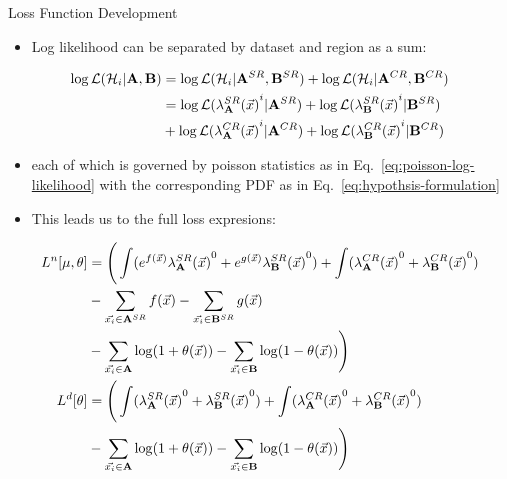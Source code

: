 \documentclass[notheorems]{beamer}
\begin{document}
\begin{frame}{Loss Function Development}
    \begin{itemize}
        \item Log likelihood can be separated by dataset and region as a sum:
    \end{itemize}
    \begin{equation}
    \begin{aligned}
        \log\mathcal{L}({\mathcal{H}_{i}} | {\mathbf{A}}, {\mathbf{B}})
        &= \log\mathcal{L}({\mathcal{H}_{i}}|{\mathbf{A}}^{SR}, {\mathbf{B}}^{SR}) + \log\mathcal{L}({\mathcal{H}_{i}}|{\mathbf{A}}^{CR}, {\mathbf{B}}^{CR}) \\&
        = \log\mathcal{L}({{\lambda}_{{\mathbf{A}}}^{SR}(\vec{{x}})}^i|{\mathbf{A}}^{SR}) + \log\mathcal{L}({{\lambda}_{{\mathbf{B}}}^{SR}(\vec{{x}})}^i|{\mathbf{B}}^{SR}) \\&
        + \log\mathcal{L}({{\lambda}_{{\mathbf{A}}}^{CR}(\vec{{x}})}^i|{\mathbf{A}}^{CR}) + \log\mathcal{L}({{\lambda}_{{\mathbf{B}}}^{CR}(\vec{{x}})}^i|{\mathbf{B}}^{CR})
    \end{aligned}
    \end{equation}
    \begin{itemize}
        \item each of which is governed by poisson statistics as in Eq.~\ref{eq:poisson-log-likelihood} with the corresponding PDF as in Eq.~\ref{eq:hypothsis-formulation}
    \end{itemize}
\end{frame}

\begin{frame}
    \begin{itemize}
        \item This leads us to the full loss expresions:
    \end{itemize}
    \begin{equation}
    \begin{aligned}
        L^{n}[{\mu}, {\theta}] &= \Bigg(
            \int (e^{f(\vec{{x}})}{{\lambda}_{{\mathbf{A}}}^{SR}(\vec{{x}})}^0 + e^{g(\vec{{x}})}{{\lambda}_{{\mathbf{B}}}^{SR}(\vec{{x}})}^0)
            + \int ({{\lambda}_{{\mathbf{A}}}^{CR}(\vec{{x}})}^0 + {{\lambda}_{{\mathbf{B}}}^{CR}(\vec{{x}})}^0)
            \\&
            - \sum\limits_{{\vec{{x}_i}} \in {\mathbf{A}}^{SR}} f(\vec{{x}})
            - \sum\limits_{{\vec{{x}_i}} \in {\mathbf{B}}^{SR}} g(\vec{{x}}) \\&
            - \sum\limits_{{\vec{{x}_i}} \in {\mathbf{A}}} \log(1 + {{\theta}(\vec{{x}})})
            - \sum\limits_{{\vec{{x}_i}} \in {\mathbf{B}}} \log(1 - {{\theta}(\vec{{x}})})
        \Bigg)
        \\
        L^{d}[{\theta}] &= \Bigg(
            \int ({{\lambda}_{{\mathbf{A}}}^{SR}(\vec{{x}})}^0 + {{\lambda}_{{\mathbf{B}}}^{SR}(\vec{{x}})}^0)
            + \int ({{\lambda}_{{\mathbf{A}}}^{CR}(\vec{{x}})}^0 + {{\lambda}_{{\mathbf{B}}}^{CR}(\vec{{x}})}^0)
            \\&
            - \sum\limits_{{\vec{{x}_i}} \in {\mathbf{A}}} \log(1 + {{\theta}(\vec{{x}})})
            - \sum\limits_{{\vec{{x}_i}} \in {\mathbf{B}}} \log(1 - {{\theta}(\vec{{x}})})
        \Bigg)
    \end{aligned}
    \end{equation}
\end{frame}
\end{document}
